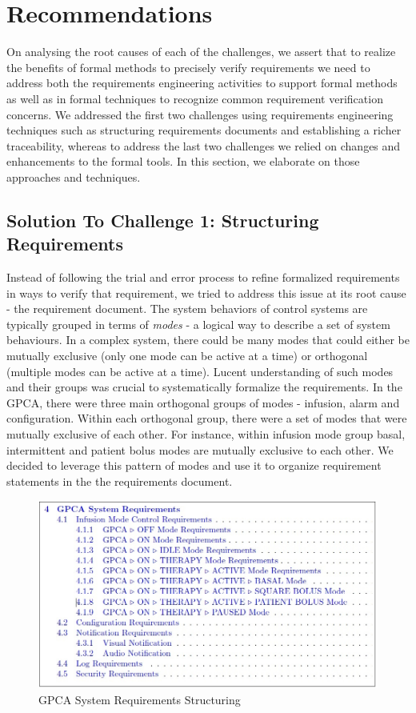 \section{Recommendations}
\label{sec:recommendations}

On analysing the root causes of each of the challenges, we assert that to realize the benefits of formal methods to precisely verify requirements we need to address both the requirements engineering activities to support formal methods as well as in formal techniques to recognize common requirement verification concerns. We addressed the first two challenges using requirements engineering techniques such as structuring requirements documents and establishing a richer traceability, whereas to address the last two challenges we relied on changes  and enhancements to the formal tools. In this section, we elaborate on those approaches and techniques.

\subsection {Solution To Challenge 1: Structuring Requirements}

Instead of following the trial and error process to refine formalized requirements in ways to verify that requirement, we tried to address this issue at its root cause - the requirement document. The system behaviors of control systems are typically grouped in terms of \emph{modes} - a logical way to describe a set of system behaviours. In a complex system, there could be many modes that could either be mutually exclusive (only one mode can be active at a time) or orthogonal (multiple modes can be active at a time). Lucent understanding of such modes and their groups was crucial to systematically formalize the requirements. In the GPCA, there were three main orthogonal groups of modes - infusion, alarm and configuration. Within each orthogonal group, there were a set of modes that were mutually exclusive of each other. For instance, within infusion mode group basal, intermittent and patient bolus modes are mutually exclusive to each other. We decided to leverage this pattern of modes and use it to organize requirement statements in the the requirements document.

 \begin{figure}[h!]
    \centering
    \includegraphics[width=\columnwidth]{images/structuring.jpg}
    \caption{GPCA System Requirements Structuring}
    \label{fig:gpca-requirements}
 \end{figure}

